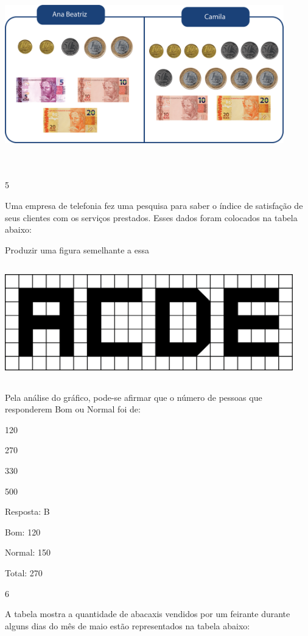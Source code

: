 \begin{escolha}
\begin{escolha}
\includegraphics[width=4.76708in,height=3.21695in]{media/image95.png}

\num{5}

Uma empresa de telefonia fez uma pesquisa para saber o índice de
satisfação de seus clientes com os serviços prestados. Esses dados foram
colocados na tabela abaixo:

Produzir uma figura semelhante a essa

\includegraphics[width=4.92543in,height=1.97517in]{media/image96.png}

Pela análise do gráfico, pode-se afirmar que o número de pessoas que
responderem Bom ou Normal foi de:

\begin{escolha}
\item
  120
\item
  270
\item
  330
\item
  500
\end{escolha}

Resposta: B

Bom: 120

Normal: 150

Total: 270

\num{6}

A tabela mostra a quantidade de abacaxis vendidos por um feirante
durante alguns dias do mês de maio estão representados na tabela abaixo:


\end{escolha}
\end{escolha}
